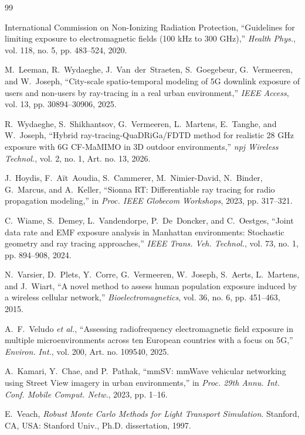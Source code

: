 \documentclass[journal]{IEEEtran}
\begin{document}
\begin{thebibliography}{99}

International Commission on Non-Ionizing Radiation Protection, ``Guidelines for
limiting exposure to electromagnetic fields (100 kHz to 300 GHz),'' \emph{Health
Phys.}, vol. 118, no. 5, pp. 483--524, 2020.

M.~Leeman, R.~Wydaeghe, J.~Van~der~Straeten, S.~Goegebeur, G.~Vermeeren, and
W.~Joseph, ``City-scale spatio-temporal modeling of 5G downlink exposure of
users and non-users by ray-tracing in a real urban environment,'' \emph{IEEE
Access}, vol. 13, pp. 30894--30906, 2025.

R.~Wydaeghe, S.~Shikhantsov, G.~Vermeeren, L.~Martens, E.~Tanghe, and W.~Joseph,
``Hybrid ray-tracing-QuaDRiGa/FDTD method for realistic 28 GHz exposure with 6G
CF-MaMIMO in 3D outdoor environments,'' \emph{npj Wireless Technol.}, vol. 2,
no. 1, Art. no. 13, 2026.

J.~Hoydis, F.~A\"it~Aoudia, S.~Cammerer, M.~Nimier-David, N.~Binder,
G.~Marcus, and A.~Keller, ``Sionna RT: Differentiable ray tracing for radio
propagation modeling,'' in \emph{Proc. IEEE Globecom Workshops}, 2023,
pp. 317--321.

C.~Wiame, S.~Demey, L.~Vandendorpe, P.~De~Doncker, and C.~Oestges, ``Joint data
rate and EMF exposure analysis in Manhattan environments: Stochastic geometry
and ray tracing approaches,'' \emph{IEEE Trans. Veh. Technol.}, vol. 73, no. 1,
pp. 894--908, 2024.

N.~Varsier, D.~Plets, Y.~Corre, G.~Vermeeren, W.~Joseph, S.~Aerts, L.~Martens,
and J.~Wiart, ``A novel method to assess human population exposure induced by a
wireless cellular network,'' \emph{Bioelectromagnetics}, vol. 36, no. 6,
pp. 451--463, 2015.

A.~F.~Veludo \emph{et al.}, ``Assessing radiofrequency electromagnetic field
exposure in multiple microenvironments across ten European countries with a
focus on 5G,'' \emph{Environ. Int.}, vol. 200, Art. no. 109540, 2025.

A.~Kamari, Y.~Chae, and P.~Pathak, ``mmSV: mmWave vehicular networking using
Street View imagery in urban environments,'' in \emph{Proc. 29th Annu. Int.
Conf. Mobile Comput. Netw.}, 2023, pp. 1--16.

E.~Veach, \emph{Robust Monte Carlo Methods for Light Transport Simulation}.
Stanford, CA, USA: Stanford Univ., Ph.D. dissertation, 1997.


\end{thebibliography}
\end{document}

